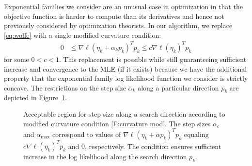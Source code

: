 Exponential families we consider are an unusual case in optimization in that the 
objective function 
is harder to compute than its derivatives and hence not previously considered by 
optimization theorists.
In our algorithm, we replace \eqref{eq:wolfe} with a single modified curvature 
condition:
\begin{align} \label{E:curvature mod}
	 0 & \leq \nabla \ell( \eta_k + \alpha_k p_k)^T p_k \leq c \nabla \ell(\eta_k)^T p_k
\end{align}
for some $0 < c < 1$.  This replacement is possible while still guaranteeing 
sufficient increase and convergence to the MLE (if it exists) 
because we have the additional property that the exponential family log likelihood 
function we consider is strictly 
concave.  The restrictions on the step size $\alpha_k$ along a particular direction 
$p_k$ are depicted in Figure~\ref{F:alpha_region}.  

\begin{figure}[h]
\centering
    \scalebox{.55}{}
	\caption[Acceptable region for step size $\alpha$ along search 
direction $p$ according to modified curvature condition]{Acceptable region for step size 
along a search direction according to modified curvature condition 
\eqref{E:curvature mod}. The step sizes $\alpha_{c}$ and $\alpha_{\textrm{max}}$ 
correspond to values of $\nabla \ell( \eta_k + \alpha p_k)^T p_k$ equaling 
$c \nabla \ell(\eta_k)^T p_k$ and $0$, 
respectively.  The condition ensures sufficient increase in the log likelihood along 
the search direction $p_k$.}
\label{F:alpha_region}
\end{figure}
 



